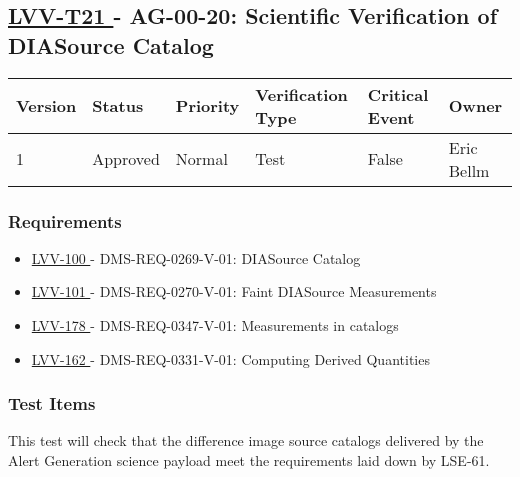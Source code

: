 \subsection{ \href{https://jira.lsstcorp.org/secure/Tests.jspa\#/testCase/LVV-T21}{ LVV-T21 }
             - AG-00-20: Scientific Verification of DIASource Catalog }\label{lvv-t21}





\begin{longtable}[]{llllll}
\toprule
Version & Status & Priority & Verification Type & Critical Event & Owner
\\\midrule
1 & Approved & Normal & Test & False & Eric Bellm
\\\bottomrule
\end{longtable}

\subsubsection{Requirements}

\begin{itemize}

\item \href{https://jira.lsstcorp.org/browse/LVV-100}{ LVV-100 } - DMS-REQ-0269-V-01: DIASource Catalog

\item \href{https://jira.lsstcorp.org/browse/LVV-101}{ LVV-101 } - DMS-REQ-0270-V-01: Faint DIASource Measurements

\item \href{https://jira.lsstcorp.org/browse/LVV-178}{ LVV-178 } - DMS-REQ-0347-V-01: Measurements in catalogs

\item \href{https://jira.lsstcorp.org/browse/LVV-162}{ LVV-162 } - DMS-REQ-0331-V-01: Computing Derived Quantities

\end{itemize}


\subsubsection{Test Items}

This test will check that the difference image source catalogs delivered
by the Alert Generation science payload meet the requirements laid down
by LSE-61.

